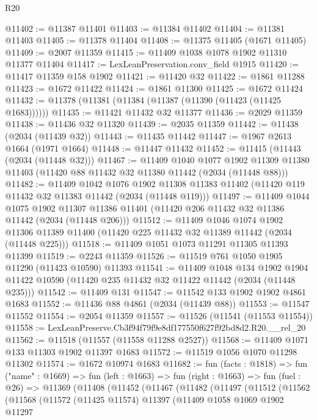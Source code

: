 \begin{lexlean}{R20}
\begin{coremodule}
@11402 := @11387 @11401
@11403 := @11384 @11402
@11404 := @11381 @11403
@11405 := @11378 @11404
@11408 := @11375 @11405 (@1671 @11405)
@11409 := @2007 @11359
@11415 := @11409 @1038 @1078 @1902 @11310 @11377 @11404
@11417 := LexLeanPreservation.conv_field @1915
@11420 := @11417 @11359 @158 @1902
@11421 := @11420 @32
@11422 := @1861 @11288
@11423 := @1672 @11422
@11424 := @1861 @11300
@11425 := @1672 @11424
@11432 := @11378 (@11381 (@11384 (@11387 (@11390 (@11423 (@11425 @1683))))))
@11435 := @11421 @11432 @32 @11377
@11436 := @2029 @11359
@11438 := @11436 @32 @11320
@11439 := @2035 @11359
@11442 := @11438 (@2034 (@11439 @32))
@11443 := @11435 @11442
@11447 := @1967 @2613 @1664 (@1971 @1664)
@11448 := @11447 @11432
@11452 := @11415 (@11443 (@2034 (@11448 @32)))
@11467 := @11409
    @1040
    @1077
    @1902
    @11309
    @11380
    @11403
    (@11420 @88 @11432 @32 @11380 @11442 (@2034 (@11448 @88)))
@11482 := @11409
    @1042
    @1076
    @1902
    @11308
    @11383
    @11402
    (@11420 @119 @11432 @32 @11383 @11442 (@2034 (@11448 @119)))
@11497 := @11409
    @1044
    @1075
    @1902
    @11307
    @11386
    @11401
    (@11420 @206 @11432 @32 @11386 @11442 (@2034 (@11448 @206)))
@11512 := @11409
    @1046
    @1074
    @1902
    @11306
    @11389
    @11400
    (@11420 @225 @11432 @32 @11389 @11442 (@2034 (@11448 @225)))
@11518 := @11409 @1051 @1073 @11291 @11305 @11393 @11399
@11519 := @2243 @11359
@11526 := @11519 @761 @1050 @1905 @11290 (@11423 @10590) @11393
@11541 := @11409
    @1048
    @134
    @1902
    @1904
    @11422
    @10590
    (@11420 @235 @11432 @32 @11422 @11442 (@2034 (@11448 @235)))
@11542 := @11409 @131
@11547 := @11542 @133 @1902 @1902 @4861 @1683
@11552 := @11436 @88 @4861 (@2034 (@11439 @88))
@11553 := @11547 @11552
@11554 := @2054 @11359
@11557 := @11526 (@11541 (@11553 @11554))
@11558 := LexLeanPreserve.Cb3f94f79f9e8df177550f627f92bd8d2.R20.__rel_20
@11562 := @11518 (@11557 (@11558 @11288 @2527))
@11568 := @11409 @1071 @133 @11303 @1902 @11397 @1683
@11572 := @11519 @1056 @1070 @11298 @11302
@11574 := @1672 @10974 @1683
@11682 := fun (facts : @1818) =>
  fun ("name" : @1669) =>
  fun (left : @1663) =>
  fun (right : @1663) =>
  fun (fuel : @26) =>
  @11369
    (@11408
      (@11452
        (@11467
          (@11482
            (@11497
              (@11512
                (@11562
                  (@11568
                    (@11572
                      (@11425 @11574)
                      @11397
                      (@11409
                        @1058
                        @1069
                        @1902
                        @11297

\end{coremodule}
\end{lexlean}
